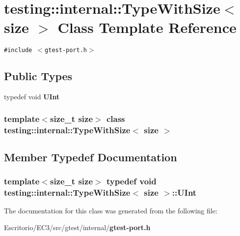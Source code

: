 \section{testing::internal::TypeWithSize$<$ size $>$ Class Template Reference}
\label{classtesting_1_1internal_1_1TypeWithSize}
{\tt \#include $<$gtest-port.h$>$}

\subsection*{Public Types}
\begin{CompactItemize}
\item 
typedef void {\bf UInt}
\end{CompactItemize}
\subsubsection*{template$<$size\_\-t size$>$ class testing::internal::TypeWithSize$<$ size $>$}



\subsection{Member Typedef Documentation}
\subsubsection{\setlength{\rightskip}{0pt plus 5cm}template$<$size\_\-t size$>$ typedef void {\bf testing::internal::TypeWithSize}$<$ size $>$::{\bf UInt}}\label{classtesting_1_1internal_1_1TypeWithSize_adebd49e9739f576ff09cb2b0ef5a208}




The documentation for this class was generated from the following file:\begin{CompactItemize}
\item 
Escritorio/EC3/src/gtest/internal/{\bf gtest-port.h}\end{CompactItemize}
